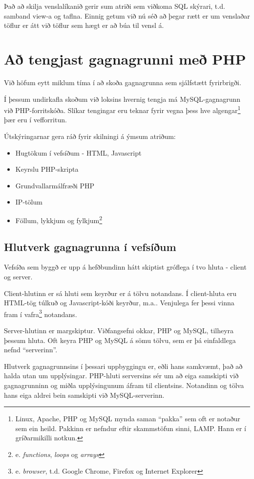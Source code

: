 Það að skilja venslalíkanið gerir sum atriði sem viðkoma SQL skýrari, t.d. samband view-a og taflna. Einnig getum við nú séð að þegar rætt er um venslaðar töflur er átt við töflur sem hægt er að búa til vensl á.


\section{Að tengjast gagnagrunni með PHP}
\label{undirkafli:php}
Við höfum eytt miklum tíma í að skoða gagnagrunna sem sjálfstætt fyrirbrigði.

Í þessum undirkafla skoðum við loksins hvernig tengja má MySQL-gagnagrunn við PHP-forritskóða.
Slíkar tengingar eru teknar fyrir vegna þess hve algengar\footnote{Linux, Apache, PHP og MySQL mynda saman ``pakka'' sem oft er notaður sem ein heild. Pakkinn er nefndur eftir skammstöfun sinni, LAMP. Hann er í gríðarmikilli notkun.} þær eru í vefforritun.

Útskýringarnar gera ráð fyrir skilningi á ýmsum atriðum:
\begin{itemize}
 \item Hugtökum í vefsíðum - HTML, Javascript
 \item Keyrslu PHP-skripta
 \item Grundvallarmálfræði PHP
 \item IP-tölum
 \item Föllum, lykkjum og fylkjum\footnote{e. \emph{functions}, \emph{loops} og \emph{arrays}}
\end{itemize}
\subsection{Hlutverk gagnagrunna í vefsíðum}
Vefsíða sem byggð er upp á hefðbundinn hátt skiptist gróflega í tvo hluta - client og server. 

Client-hlutinn er sá hluti sem keyrður er á tölvu notandans. Í client-hluta eru HTML-tög túlkuð og Javascript-kóði keyrður, m.a.. Venjulega fer þessi vinna fram í vafra\footnote{e. \emph{browser}, t.d. Google Chrome, Firefox og Internet Explorer} notandans.

Server-hlutinn er margskiptur. Viðfangsefni okkar, PHP og MySQL, tilheyra þessum hluta. Oft keyra PHP og MySQL á sömu tölvu, sem er þá einfaldlega nefnd ``serverinn''.

Hlutverk gagnagrunnsins í þessari uppbyggingu er, eðli hans samkvæmt, það að halda utan um upplýsingar. PHP-hluti serversins sér um að eiga samskipti við gagnagrunninn og miðla upplýsingunum áfram til clientsins. Notandinn og tölva hans eiga aldrei bein samskipti við MySQL-serverinn.


